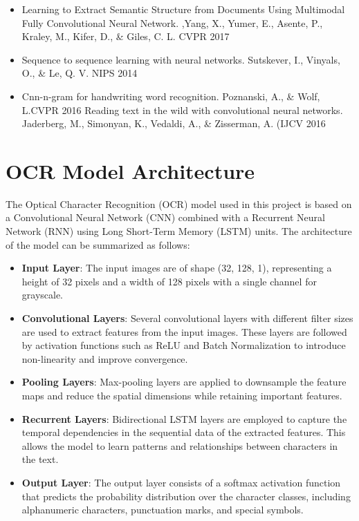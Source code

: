 \documentclass{article}
\begin{document}
\begin{itemize}
\item Learning to Extract Semantic Structure from Documents Using Multimodal Fully Convolutional Neural Network. ,Yang, X., Yumer, E., Asente, P., Kraley, M., Kifer, D., \& Giles, C. L. CVPR 2017

\item Sequence to sequence learning with neural networks. Sutskever, I., Vinyals, O., \& Le, Q. V. NIPS 2014

\item Cnn-n-gram for handwriting word recognition. Poznanski, A., \& Wolf, L.CVPR 2016
Reading text in the wild with convolutional neural networks. Jaderberg, M., Simonyan, K., Vedaldi, A., \& Zisserman, A. (IJCV 2016

\end{itemize}

\section{OCR Model Architecture}

The Optical Character Recognition (OCR) model used in this project is based on a Convolutional Neural Network (CNN) combined with a Recurrent Neural Network (RNN) using Long Short-Term Memory (LSTM) units. The architecture of the model can be summarized as follows:

\begin{itemize}
    \item \textbf{Input Layer}: The input images are of shape (32, 128, 1), representing a height of 32 pixels and a width of 128 pixels with a single channel for grayscale.
    
    \item \textbf{Convolutional Layers}: Several convolutional layers with different filter sizes are used to extract features from the input images. These layers are followed by activation functions such as ReLU and Batch Normalization to introduce non-linearity and improve convergence.
    
    \item \textbf{Pooling Layers}: Max-pooling layers are applied to downsample the feature maps and reduce the spatial dimensions while retaining important features.
    
    \item \textbf{Recurrent Layers}: Bidirectional LSTM layers are employed to capture the temporal dependencies in the sequential data of the extracted features. This allows the model to learn patterns and relationships between characters in the text.
    
    \item \textbf{Output Layer}: The output layer consists of a softmax activation function that predicts the probability distribution over the character classes, including alphanumeric characters, punctuation marks, and special symbols.
\end{itemize}
\end{document}
